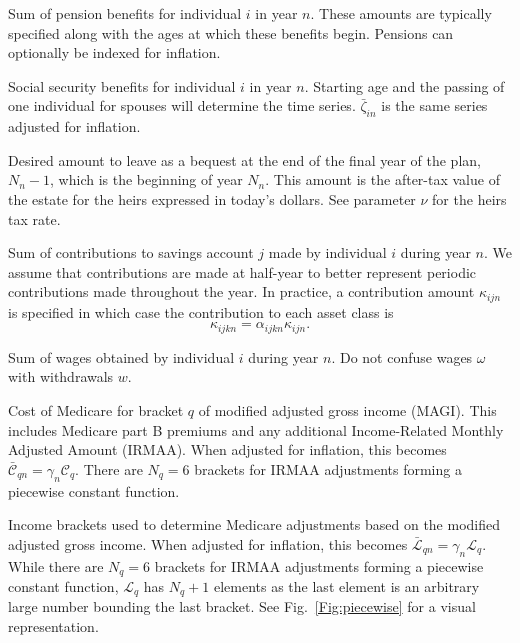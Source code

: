 \documentclass{report}[fleqn,11pt]
\begin{document}
\begin{description}[leftmargin=4em,style=multiline]
\item [$\pi_{in}$]
	Sum of pension benefits for individual $i$ in year $n$. These amounts are typically
	specified along with the ages at which these benefits begin.
	Pensions can optionally be indexed for inflation.
\item [$\zeta_{in}$]
	Social security benefits for individual $i$ in year $n$. Starting age and the passing
	of one individual for spouses will determine the time series. $\bar{\zeta}_{in}$ is
	the same series adjusted for inflation.
\item [$\epsilon_{N_n}$]
	Desired amount to leave as a bequest at the end of the final year of the plan, $N_n-1$,
	which is the beginning of year $N_n$. This amount is the after-tax value of the estate
	for the heirs expressed in today's dollars. See parameter $\nu$ for the heirs tax rate.
\item [$\kappa_{ijn}$]
	Sum of contributions to savings account $j$ made by individual $i$ during year $n$.
	We assume that contributions are made at half-year to better represent periodic
        contributions made throughout the year.
	In practice, a contribution
	amount $\kappa_{ijn}$ is specified in which case the contribution to each asset
	class is
	\begin{equation}
		\kappa_{ijkn} = \alpha_{ijkn}\kappa_{ijn}.
	\end{equation}
\item [$\omega_{in}$]
	Sum of wages obtained by individual $i$ during year $n$.
	Do not confuse wages $\omega$ with withdrawals $w$.
\item [$\mathcal{C}_{q}$]
	Cost of Medicare for bracket $q$ of modified adjusted gross income (MAGI). This includes
	Medicare part B premiums and any additional
	Income-Related Monthly Adjusted Amount (IRMAA). When adjusted
	for inflation, this becomes $\bar{\mathcal{C}}_{qn} = \gamma_n\mathcal{C}_q$.
        There are $N_q=6$ brackets for IRMAA adjustments forming a piecewise constant function.
\item [$\mathcal{L}_{q}$]
	Income brackets used to determine Medicare adjustments based on the modified adjusted gross income.
	When adjusted for inflation, this becomes $\bar{\mathcal{L}}_{qn} = \gamma_n\mathcal{L}_q$.
        While there are $N_q=6$ brackets for IRMAA adjustments forming a piecewise constant function,
	$\mathcal{L}_q$ has $N_q + 1$ elements as the last element is an arbitrary large number bounding the
	last bracket. See Fig.~\ref{Fig:piecewise} for a visual representation.
\item [$\mu$]

\end{description}
\end{document}
